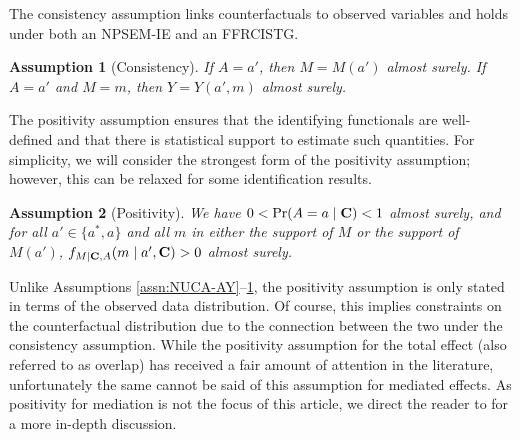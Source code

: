 \documentclass[12pt]{article}
\newtheorem{assumption}{Assumption}
\begin{document}
The consistency assumption links counterfactuals to observed variables and holds under both an NPSEM-IE and an FFRCISTG.
\begin{assumption}[Consistency]
    \label{assn:consistency}
    If $A=a'$, then $M=M(a')$ almost surely. If $A=a'$ and $M=m$, then $Y=Y(a',m)$ almost surely.
\end{assumption}

The positivity assumption ensures that the identifying functionals are well-defined and that there is statistical support to estimate such quantities. For simplicity, we will consider the strongest form of the positivity assumption; however, this can be relaxed for some identification results. %
\begin{assumption}[Positivity]
    \label{assn:positivity}
    We have $0< \mathrm{Pr}(A=a\mid {\bf C})<1$ almost surely, %
    and for all $a'\in\{a^*,a\}$ and all $m$ in either the support of $M$ or the support of $M(a')$, $f_{M\mid {\bf C},A}(m\mid a',{\bf C})>0$ almost surely.%
\end{assumption}
Unlike Assumptions \ref{assn:NUCA-AY}--\ref{assn:consistency}, the positivity assumption is only stated in terms of the observed data distribution. Of course, this implies constraints on the counterfactual distribution due to the connection between the two under the consistency assumption. While the positivity assumption for the total effect (also referred to as overlap) has received a fair amount of attention in the literature, unfortunately the same cannot be said of this assumption for mediated effects. As positivity for mediation is not the focus of this article, we direct the reader to \cite{nguyen2022clarifying} for a more in-depth discussion.
\end{document}
